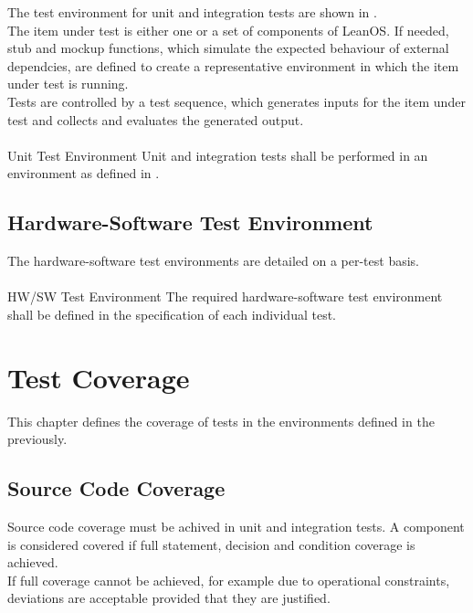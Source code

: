 The test environment for unit and integration tests are shown in
.\\

\noindent
The item under test is either one or a set of components of LeanOS. If needed,
stub and mockup functions, which simulate the expected behaviour of external
dependcies, are defined to create a representative environment in which the item
under test is running.\\

\noindent
Tests are controlled by a test sequence, which generates inputs for the item
under test and collects and evaluates the generated output.\\
\\

 {Unit Test Environment}{%
Unit and integration tests shall be performed in an environment as defined in %
. %
}{}%


\section{Hardware-Software Test Environment}

The hardware-software test environments are detailed on a per-test basis.\\
\\

 {HW/SW Test Environment}{%
The required hardware-software test environment shall be defined in the %
specification of each individual test.%
}{}%

\chapter{Test Coverage}

This chapter defines the coverage of tests in the environments defined in the
previously.


\section{Source Code Coverage}

Source code coverage must be achived in unit and integration tests.
A component is considered covered if full statement, decision and condition
coverage is achieved. \\

\noindent
If full coverage cannot be achieved, for example due to operational constraints,
deviations are acceptable provided that they are justified.\\
\\

